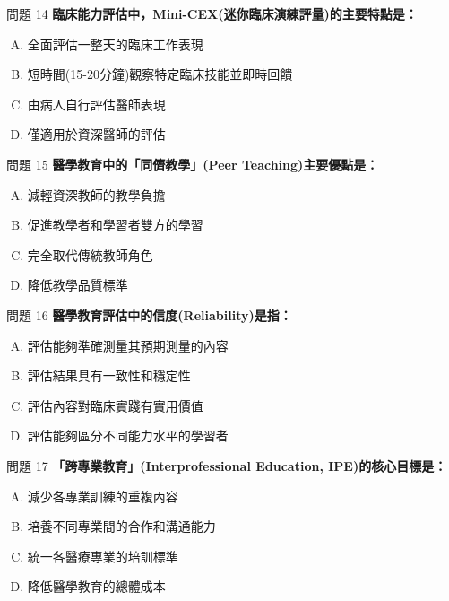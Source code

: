 \documentclass[aspectratio=169]{beamer}
\begin{document}
\begin{frame}{問題 14}
  \textbf{臨床能力評估中，Mini-CEX(迷你臨床演練評量)的主要特點是：}
  \begin{enumerate}[A.]
    \item 全面評估一整天的臨床工作表現
    \item 短時間(15-20分鐘)觀察特定臨床技能並即時回饋
    \item 由病人自行評估醫師表現
    \item 僅適用於資深醫師的評估
  \end{enumerate}
\end{frame}

\begin{frame}{問題 15}
  \textbf{醫學教育中的「同儕教學」(Peer Teaching)主要優點是：}
  \begin{enumerate}[A.]
    \item 減輕資深教師的教學負擔
    \item 促進教學者和學習者雙方的學習
    \item 完全取代傳統教師角色
    \item 降低教學品質標準
  \end{enumerate}
\end{frame}

\begin{frame}{問題 16}
  \textbf{醫學教育評估中的信度(Reliability)是指：}
  \begin{enumerate}[A.]
    \item 評估能夠準確測量其預期測量的內容
    \item 評估結果具有一致性和穩定性
    \item 評估內容對臨床實踐有實用價值
    \item 評估能夠區分不同能力水平的學習者
  \end{enumerate}
\end{frame}

\begin{frame}{問題 17}
  \textbf{「跨專業教育」(Interprofessional Education, IPE)的核心目標是：}
  \begin{enumerate}[A.]
    \item 減少各專業訓練的重複內容
    \item 培養不同專業間的合作和溝通能力
    \item 統一各醫療專業的培訓標準
    \item 降低醫學教育的總體成本
  \end{enumerate}
\end{frame}
\end{document}
